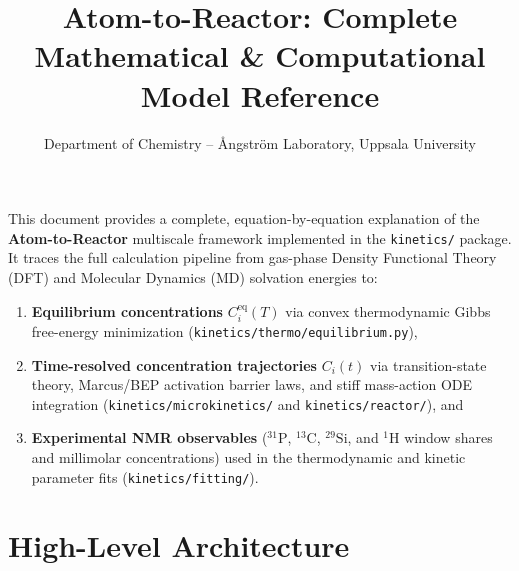 \documentclass[11pt,a4paper]{article}
\title{\textbf{Atom-to-Reactor: Complete Mathematical \& Computational Model Reference}}
\author{Department of Chemistry -- \AA ngstr\"om Laboratory, Uppsala University}
\date{}
\let\origsection\section
\renewcommand{\section}{\clearpage\origsection}
\begin{document}
\sloppy
\maketitle

This document provides a complete, equation-by-equation explanation of the \textbf{Atom-to-Reactor} multiscale framework implemented in the \texttt{kinetics/\allowbreak{}} package. It traces the full calculation pipeline from gas-phase Density Functional Theory (DFT) and Molecular Dynamics (MD) solvation energies to:

\begin{enumerate}[leftmargin=1.8em]
    \item \textbf{Equilibrium concentrations} $C_i^{\text{eq}}(T)$ via convex thermodynamic Gibbs free-energy minimization (\texttt{kinetics/\allowbreak{}thermo/\allowbreak{}equilibrium.py}),
    \item \textbf{Time-resolved concentration trajectories} $C_i(t)$ via transition-state theory, Marcus/BEP activation barrier laws, and stiff mass-action ODE integration (\texttt{kinetics/\allowbreak{}microkinetics/\allowbreak{}} and \texttt{kinetics/\allowbreak{}reactor/\allowbreak{}}), and
    \item \textbf{Experimental NMR observables} ($^{31}\text{P}$, $^{13}\text{C}$, $^{29}\text{Si}$, and $^1\text{H}$ window shares and millimolar concentrations) used in the thermodynamic and kinetic parameter fits (\texttt{kinetics/\allowbreak{}fitting/\allowbreak{}}).
\end{enumerate}


\section{High-Level Architecture}
\end{document}
